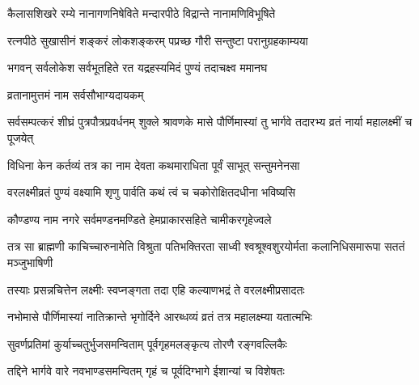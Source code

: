 


\twolineshloka
{कैलासशिखरे रम्ये नानागणनिषेविते}
{मन्दारपीठे विद्रान्ते नानामणिविभूषिते} %

\twolineshloka
{रत्नपीठे सुखासीनं शङ्करं लोकशङ्करम्}
{पप्रच्छ गौरी सन्तुष्टा परानुग्रहकाम्यया} %


\twolineshloka
{भगवन् सर्वलोकेश सर्वभूतहिते रत}
{यद्रहस्यमिदं पुण्यं तदाचक्ष्व ममानघ} %



\onelineshloka
{व्रतानामुत्तमं नाम सर्वसौभाग्यदायकम्} %

\threelineshloka
{सर्वसम्पत्करं शीघ्रं पुत्रपौत्रप्रवर्धनम्}
{शुक्ले श्रावणके मासे पौर्णिमास्यां तु भार्गवे} %
{तदारभ्य व्रतं नार्या महालक्ष्मीं च पूजयेत्}


\twolineshloka
{विधिना केन कर्तव्यं तत्र का नाम देवता}
{कथमाराधिता पूर्वं साभूत् सन्तुमनेनसा} %


\twolineshloka
{वरलक्ष्मीव्रतं पुण्यं वक्ष्यामि शृणु पार्वति}
{कथं त्वं च चकोरोक्षितदधीना भविष्यसि} %

\twolineshloka
{कौण्डण्य नाम नगरे सर्वमण्डनमण्डिते}
{हेमप्राकारसहिते चामीकरगृहेज्वले} %

\threelineshloka
{तत्र सा ब्राह्मणी काचिच्चारुनामेति विश्रुता}
{पतिभक्तिरता साध्वी श्वश्रूश्वशुरयोर्मता}
{कलानिधिसमारूपा सततं मञ्जुभाषिणी} %

\twolineshloka
{तस्याः प्रसन्नचित्तेन लक्ष्मीः स्वप्नङ्गता तदा}
{एहि कल्याणभद्रं ते वरलक्ष्मीप्रसादतः} %

\twolineshloka
{नभोमासे पौर्णिमास्यां नातिक्रान्ते भृगोर्दिने}
{आरब्धव्यं व्रतं तत्र महालक्ष्म्या यतात्मभिः} %

\twolineshloka
{सुवर्णप्रतिमां कुर्याच्चतुर्भुजसमन्विताम्}
{पूर्वगृहमलङ्कृत्य तोरणै रङ्गवल्लिकैः} %

\twolineshloka
{तद्दिने भार्गवे वारे नवभाण्डसमन्वितम्}
{गृहं च पूर्वदिग्भागे ईशान्यां च विशेषतः} %

